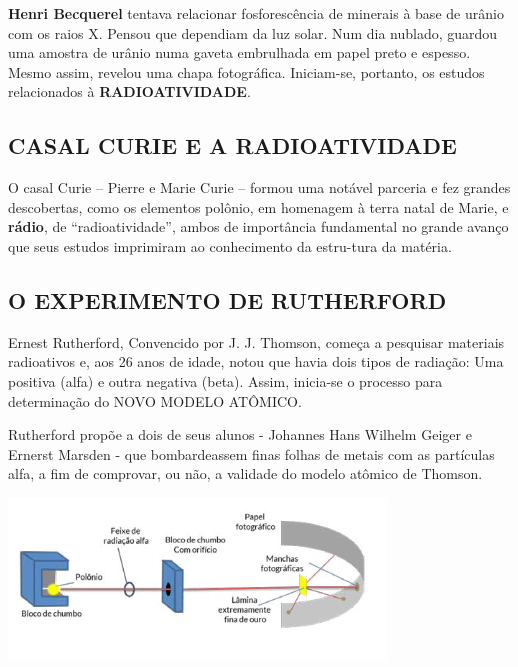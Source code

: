\documentclass[10pt]{scrartcl}
\begin{document}
\textbf{Henri Becquerel} tentava relacionar fosforescência de minerais à base de urânio com os raios X. Pensou que dependiam da luz solar. Num dia nublado, guardou uma amostra de urânio numa gaveta embrulhada em papel preto e espesso. Mesmo assim, revelou uma chapa fotográfica. Iniciam-se, portanto, os estudos relacionados à \textbf{RADIOATIVIDADE}.


\subsection{CASAL CURIE E A RADIOATIVIDADE}
\label{sec:org342ab5f}


O casal Curie  – Pierre e Marie Curie – formou uma notável parceria e fez grandes descobertas, como os elementos polônio, em homenagem à terra natal de  Marie,  e  \textbf{rádio},  de  “radioatividade”,  ambos  de  importância  fundamental  no  grande  avanço  que  seus estudos imprimiram ao conhecimento da estru-tura da matéria.

\subsection{O EXPERIMENTO DE RUTHERFORD}
\label{sec:org8cd2f7c}

Ernest Rutherford, Convencido por J. J. Thomson, começa a pesquisar materiais radioativos e, aos 26 anos de idade, notou que havia dois tipos de radiação: Uma positiva (alfa) e outra negativa (beta). Assim, inicia-se o processo para determinação do NOVO MODELO ATÔMICO.

Rutherford propõe a dois de seus alunos - Johannes Hans  Wilhelm  Geiger  e  Ernerst  Marsden  -  que  bombardeassem  finas  folhas  de  metais  com  as  partículas alfa, a fim de comprovar, ou não, a validade do modelo atômico de Thomson.

\begin{center}
\includegraphics[width=.9\linewidth]{Quimica-Geral-Aula/placa.png}
\end{center}
\end{document}
